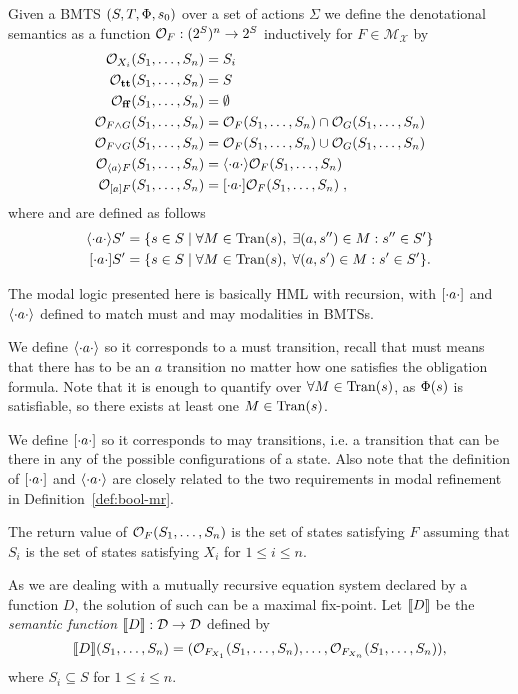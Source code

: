 Given a BMTS $(S,T,\mathrm{\Phi},s_0)$ over a set of actions $\Sigma$ we define the
denotational semantics as a function $\mathcal{O}_{F}: (2^S)^n \rightarrow 2^S$  
inductively for $F \in \mathcal{M_X}$ by
	\begin{align*}
		\mathcal{O}_{X_i}(S_1,\ldots,S_n) &= S_i\\
		\mathcal{O}_{\mathbf{tt}}(S_1,\ldots,S_n) &= S\\		
		\mathcal{O}_{\mathbf{ff}}(S_1,\ldots,S_n) &= \emptyset \\
		\mathcal{O}_{F \wedge G}(S_1,\ldots,S_n) &= \mathcal{O}_{F}(S_1,\ldots,S_n) \cap \mathcal{O}_{G}(S_1,\ldots,S_n) \\
		\mathcal{O}_{F \vee G}(S_1,\ldots,S_n) &= \mathcal{O}_{F}(S_1,\ldots,S_n) \cup \mathcal{O}_{G}(S_1,\ldots,S_n) \\
		\mathcal{O}_{\langle a \rangle F}(S_1,\ldots,S_n) &= \langle \cdot a \cdot \rangle\mathcal{O}_{F}(S_1,\ldots,S_n) \\
		\mathcal{O}_{[a] F}(S_1,\ldots,S_n) &= [ \cdot a \cdot ]\mathcal{O}_{F}(S_1,\ldots,S_n)\;,
	\end{align*}
where  and  are defined as follows
\begin{align*}
	\diad{a}S' &= \{s \in S \mid \forall M \in \val(s) ,\; \exists (a,s'') \in M : s'' \in S'\}\\
	\boxd{a}S' &= \{s \in S \mid \forall M \in \val(s) ,\; \forall (a,s') \in M : s' \in S'\}.
\end{align*}

The modal logic presented here is basically HML with recursion, with $[ \cdot a \cdot ]$ and $\langle \cdot a \cdot \rangle$ defined to match must and may modalities in BMTSs.

We define $\langle \cdot a \cdot \rangle$ so it corresponds to a must transition, recall that must means that there has to be an $a$ transition no matter how one satisfies the obligation formula. Note that it is enough to quantify over $\forall M \in \mathrm{Tran}(s)$, as $\mathrm{\Phi}(s)$ is satisfiable, so there exists at least one $M \in \mathrm{Tran}(s)$.

We define $[ \cdot a \cdot ]$ so it corresponds to may transitions, i.e. a transition that can be there in any of the possible configurations of a state. Also note that the definition of $[ \cdot a \cdot ]$ and $\langle \cdot a \cdot \rangle$ are closely related to the two requirements in modal refinement in Definition~\ref{def:bool-mr}.

The return value of $\mathcal{O}_{F}(S_1,\ldots,S_n)$ is the set of states satisfying $F$ assuming that $S_i$ is the set of states satisfying $X_i$ for $1 \leq i \leq n$.  

As we are dealing with a mutually recursive equation system declared by a function $D$, the solution of such can be a maximal fix-point. Let $\llbracket D \rrbracket$ be the \emph{semantic function} $\llbracket D \rrbracket : \mathcal{D} \rightarrow \mathcal{D}$ defined by
	\[
		\llbracket D \rrbracket(S_1,\ldots,S_n) = (\mathcal{O}_{F_{X_1}}(S_1,\ldots,S_n),\ldots,\mathcal{O}_{F_{X_n}}(S_1,\ldots,S_n)),
	\]
	where $S_i \subseteq S$ for $1 \leq i \leq n$.

